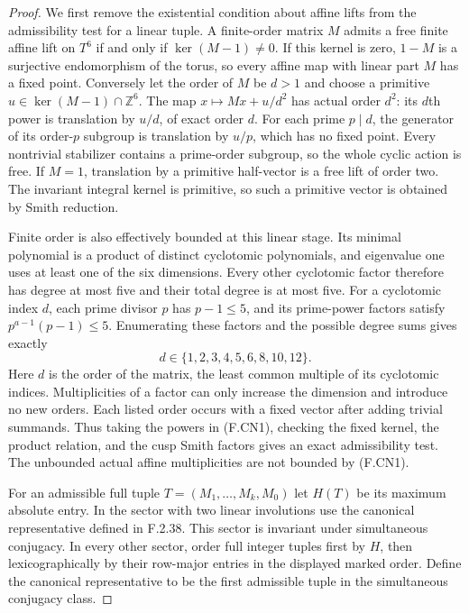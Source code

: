 \begin{proof}
We first remove the existential condition about affine lifts
from the admissibility test for a linear tuple. A finite-order
matrix $M$ admits a free finite affine lift on $T^6$ if and
only if $\ker(M-1)\ne0$. If this kernel is zero, $1-M$ is a
surjective endomorphism of the torus, so every affine map with
linear part $M$ has a fixed point. Conversely let the order of
$M$ be $d>1$ and choose a primitive $u\in\ker(M-1)\cap\mathbb Z^6$.
The map $x\mapsto Mx+u/d^2$ has actual order $d^2$: its
$d$th power is translation by $u/d$, of exact order $d$.
For each prime $p\mid d$, the generator of its order-$p$
subgroup is translation by $u/p$, which has no fixed point.
Every nontrivial stabilizer contains a prime-order subgroup,
so the whole cyclic action is free. If $M=1$, translation
by a primitive half-vector is a free lift of order two.
The invariant integral kernel is primitive, so such a
primitive vector is obtained by Smith reduction.

Finite order is also effectively bounded at this linear
stage. Its minimal polynomial is a product of distinct
cyclotomic polynomials, and eigenvalue one uses at least one
of the six dimensions. Every other cyclotomic factor therefore
has degree at most five and their total degree is at most
five. For a cyclotomic index $d$, each prime divisor $p$ has
$p-1\le5$, and its prime-power factors satisfy
$p^{a-1}(p-1)\le5$. Enumerating these factors and the possible
degree sums gives exactly
\[
                 d\in\{1,2,3,4,5,6,8,10,12\}.             \tag{F.CN1}
\]
Here $d$ is the order of the matrix, the least common multiple
of its cyclotomic indices. Multiplicities of a factor can only
increase the dimension and introduce no new orders. Each
listed order occurs with a fixed vector after adding trivial
summands. Thus taking the powers in (F.CN1), checking the
fixed kernel, the product relation, and the cusp Smith
factors gives an exact admissibility test. The unbounded
actual affine multiplicities are not bounded by (F.CN1).

For an admissible full tuple $T=(M_1,\ldots,M_k,M_0)$ let
$H(T)$ be its maximum absolute entry. In the sector with two
linear involutions use the canonical representative defined
in F.2.38. This sector is invariant under simultaneous
conjugacy. In every other sector, order full integer tuples
first by $H$, then lexicographically by their row-major
entries in the displayed marked order. Define the canonical
representative to be the first admissible tuple in the
simultaneous conjugacy class.


\end{proof}
